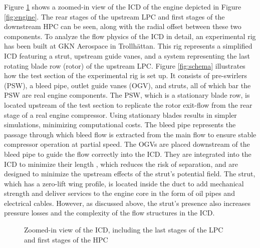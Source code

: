 Figure \ref{fig:enginezoom} shows a zoomed-in view of the ICD of the engine depicted in Figure \ref{fig:engine}. The rear stages of the upstream LPC and first stages of the downstream HPC can be seen, along with the radial offset between these two components. To analyze the flow physics of the ICD in detail, an experimental rig has been built at GKN Aerospace in Trollh\"{a}ttan. This rig represents a simplified ICD featuring a strut, upstream guide vanes, and a system representing the last rotating blade row (rotor) of the upstream LPC. Figure \ref{fig:schema} illustrates how the test section of the experimental rig is set up. It consists of pre-swirlers (PSW), a bleed pipe, outlet guide vanes (OGV), and struts, all of which bar the PSW are real engine components. The PSW, which is a stationary blade row, is located upstream of the test section to replicate the rotor exit-flow from the rear stage of a real engine compressor. Using stationary blades results in simpler simulations, minimizing computational costs. The bleed pipe represents the passage through which bleed flow is extracted from the main flow to ensure stable compressor operation at partial speed. The OGVs are placed downstream of the bleed pipe to guide the flow correctly into the ICD. They are integrated into the ICD to minimize their length \cite{Walker2011}, which reduces the risk of separation, and are designed to minimize the upstream effects of the strut's potential field. The strut, which has a zero-lift wing profile, is located inside the duct to add mechanical strength and deliver services to the engine core in the form of oil pipes and electrical cables. However, as discussed above, the strut's presence also increases pressure losses and the complexity of the flow structures in the ICD.
%
\begin{figure}[H]
  \centering
\caption{Zoomed-in view of the ICD, including the last stages of the LPC and first stages of the HPC} \label{fig:enginezoom}
\end{figure}


